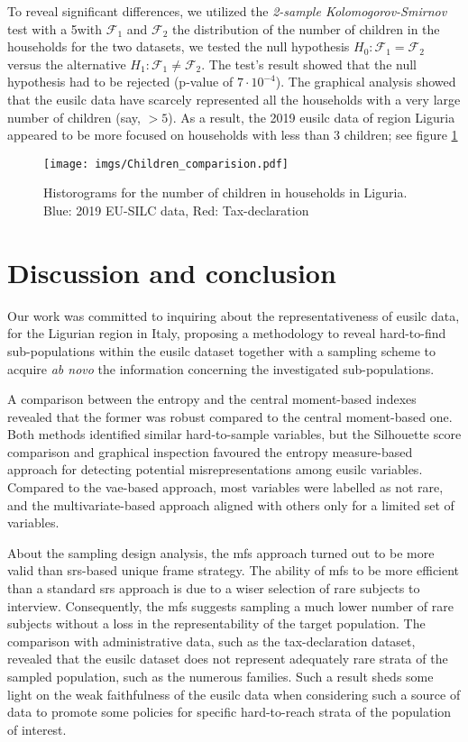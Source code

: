 To reveal significant differences, we utilized the \emph{2-sample Kolomogorov-Smirnov} test with a 5\Denoted with $\mathcal{F}_1$ and $\mathcal{F}_2$ the distribution of the number of children in the households for the two datasets, we tested the null hypothesis $H_0: \mathcal{F}_1 = \mathcal{F}_2$ versus the alternative $H_1: \mathcal{F}_1 \neq \mathcal{F}_2$.
The test's result showed that the null hypothesis had to be rejected (p-value of $7\cdot10^{-4}$).
The graphical analysis showed that the \gls{eusilc} data have scarcely represented all the households with a very large number of children (say, $>5$).
As a result, the 2019 \gls{eusilc} data of region Liguria appeared to be more focused on households with less than 3 children; see figure \ref{fig: Children_comparision}
\begin{figure}[!]
    \centering
    \texttt{[image: imgs/Children\_comparision.pdf]}
    \caption{Historograms for the number of children in households in Liguria. Blue: 2019 EU-SILC data, Red: Tax-declaration}
    \label{fig: Children_comparision}
\end{figure}

\section{Discussion and conclusion}\label{sec: discussion}

Our work was committed to inquiring about the representativeness of \gls{eusilc} data, for the Ligurian region in Italy, proposing a methodology to reveal hard-to-find sub-populations within the \gls{eusilc} dataset together with a sampling scheme to acquire \emph{ab novo} the information concerning the investigated sub-populations.

A comparison between the entropy and the central moment-based indexes revealed that the former was robust compared to the central moment-based one.
Both methods identified similar hard-to-sample variables, but the Silhouette score comparison and graphical inspection favoured the entropy measure-based approach for detecting potential misrepresentations among \gls{eusilc} variables.
Compared to the \gls{vae}-based approach, most variables were labelled as not rare, and the multivariate-based approach aligned with others only for a limited set of variables.

About the sampling design analysis, the \gls{mfs}  approach turned out to be more valid than \gls{srs}-based unique frame strategy.
The ability of \gls{mfs} to be more efficient than a standard \gls{srs} approach is due to a wiser selection of rare subjects to interview.
Consequently, the \gls{mfs} suggests sampling a much lower number of rare subjects without a loss in the representability of the target population. 
The comparison with administrative data, such as the tax-declaration dataset, revealed that the \gls{eusilc} dataset does not represent adequately rare strata of the sampled population, such as the numerous families.
Such a result sheds some light on the weak faithfulness of the \gls{eusilc} data when considering such a source of data to promote some policies for specific hard-to-reach strata of the population of interest.


